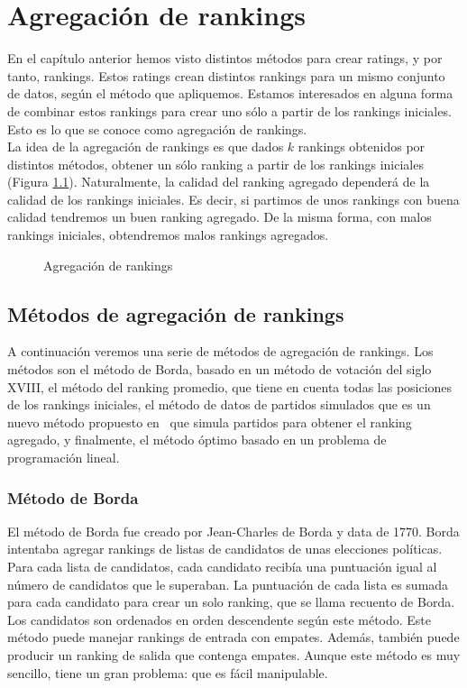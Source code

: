 \chapter{Agregación de rankings}

En el capítulo anterior hemos visto distintos métodos para crear ratings, y por tanto, rankings. Estos ratings crean distintos rankings para un mismo conjunto de datos, según el método que apliquemos. Estamos interesados en alguna forma de combinar estos rankings para crear uno sólo a partir de los rankings iniciales. Esto es lo que se conoce como agregación de rankings. \\

La idea de la agregación de rankings es que dados $k$ rankings obtenidos por distintos métodos, obtener un sólo ranking a partir de los rankings iniciales (Figura \ref{fig:agregacion_rankings}). Naturalmente, la calidad del ranking agregado dependerá de la calidad de los rankings iniciales. Es decir, si partimos de unos rankings con buena calidad tendremos un buen ranking agregado. De la misma forma, con malos rankings iniciales, obtendremos malos rankings agregados. 

\begin{figure}[htb]
\centering
\agregacionrankings
\caption{Agregación de rankings}
\label{fig:agregacion_rankings}
\end{figure}

\section{Métodos de agregación de rankings}
A continuación veremos una serie de métodos de agregación de rankings. Los métodos son el método de Borda, basado en un método de votación del siglo XVIII, el método del ranking promedio, que tiene en cuenta todas las posiciones de los rankings iniciales, el método de datos de partidos simulados que es un nuevo método propuesto en~\cite{langville2012s} que simula partidos para obtener el ranking agregado, y finalmente, el método óptimo basado en un problema de programación lineal.
\subsection{Método de Borda}
El método de Borda fue creado por Jean-Charles de Borda y data de 1770. Borda intentaba agregar rankings de listas de candidatos de unas elecciones políticas. Para cada lista de candidatos, cada candidato recibía una puntuación igual al número de candidatos que le superaban. La puntuación de cada lista es sumada para cada candidato para crear un solo ranking, que se llama recuento de Borda. Los candidatos son ordenados en orden descendente según este método. Este método puede manejar rankings de entrada con empates. Además, también puede producir un ranking de salida que contenga empates.  Aunque este método es muy sencillo, tiene un gran problema: que es fácil manipulable.

